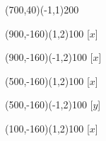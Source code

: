 \documentclass[12pt]{article}
\begin{document}
\begin{figure}[htb]
\begin{egame}
\putbranch(700,40)(-1,1){200}

\renewcommand{\egarrowstyle}{}

\putbranch(900,-160)(1,2){100}
[$x$]

\renewcommand{\egarrowstyle}{}

\putbranch(900,-160)(-1,2){100}
[$x$]

\renewcommand{\egarrowstyle}{}

\putbranch(500,-160)(1,2){100}
[$x$]

\renewcommand{\egarrowstyle}{e}

\putbranch(500,-160)(-1,2){100}
[$y$]

\renewcommand{\egarrowstyle}{e}

\putbranch(100,-160)(1,2){100}
[$x$]

\renewcommand{\egarrowstyle}{}


\end{egame}
\end{figure}
\end{document}
